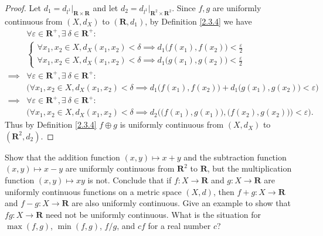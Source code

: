 \begin{proof}
    Let \(d_1 = d_{l^1}|_{\mathbf{R} \times \mathbf{R}}\) and let \(d_2 = d_{l^1}|_{\mathbf{R}^2 \times \mathbf{R}^2}\).
    Since \(f, g\) are uniformly continuous from \((X, d_X)\) to \((\mathbf{R}, d_1)\), by Definition \ref{2.3.4} we have
    \begin{align*}
                 & \forall \varepsilon \in \mathbf{R}^+, \exists\ \delta \in \mathbf{R}^+ :                                                                           \\
                 & \begin{cases}
                       \forall x_1, x_2 \in X, d_X(x_1, x_2) < \delta \implies d_1\big(f(x_1), f(x_2)\big) < \frac{\varepsilon}{2} \\
                       \forall x_1, x_2 \in X, d_X(x_1, x_2) < \delta \implies d_1\big(g(x_1), g(x_2)\big) < \frac{\varepsilon}{2}
                   \end{cases}                                        \\
        \implies & \forall \varepsilon \in \mathbf{R}^+, \exists\ \delta \in \mathbf{R}^+ :                                                                           \\
                 & \Big(\forall x_1, x_2 \in X, d_X(x_1, x_2) < \delta \implies d_1\big(f(x_1), f(x_2)\big) + d_1\big(g(x_1), g(x_2)\big) < \varepsilon\Big)          \\
        \implies & \forall \varepsilon \in \mathbf{R}^+, \exists\ \delta \in \mathbf{R}^+ :                                                                           \\
                 & \bigg(\forall x_1, x_2 \in X, d_X(x_1, x_2) < \delta \implies d_2\Big(\big(f(x_1), g(x_1)\big), \big(f(x_2), g(x_2)\big)\Big) < \varepsilon\bigg).
    \end{align*}
    Thus by Definition \ref{2.3.4} \(f \oplus g\) is uniformly continuous from \((X, d_X)\) to \((\mathbf{R}^2, d_2)\).
\end{proof}

\begin{exercise}\label{ex 2.3.6}
    Show that the addition function \((x, y) \mapsto x + y\) and the subtraction function \((x, y) \mapsto x - y\) are uniformly continuous from \(\mathbf{R}^2\) to \(\mathbf{R}\), but the multiplication function \((x, y) \mapsto xy\) is not.
    Conclude that if \(f : X \to \mathbf{R}\) and \(g : X \to \mathbf{R}\) are uniformly continuous functions on a metric space \((X, d)\), then \(f + g : X \to \mathbf{R}\) and \(f - g : X \to \mathbf{R}\) are also uniformly continuous.
    Give an example to show that \(fg : X \to \mathbf{R}\) need not be uniformly continuous.
    What is the situation for \(\max(f, g)\), \(\min(f, g)\), \(f / g\), and \(cf\) for a real number \(c\)?
\end{exercise}

